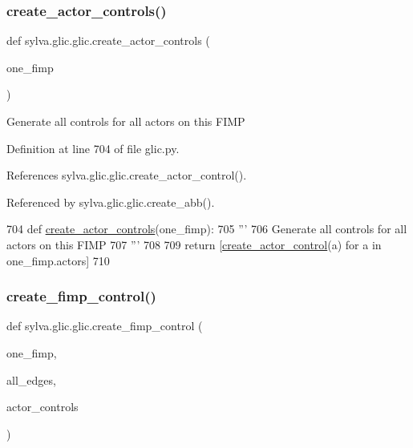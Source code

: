 \subsubsection{\texorpdfstring{create\+\_\+actor\+\_\+controls()}{create\_actor\_controls()}}
{\footnotesize\ttfamily def sylva.\+glic.\+glic.\+create\+\_\+actor\+\_\+controls (\begin{DoxyParamCaption}\item[{}]{one\+\_\+fimp }\end{DoxyParamCaption})}

\begin{DoxyVerb}  Generate all controls for all actors on this FIMP
\end{DoxyVerb}
 

Definition at line 704 of file glic.\+py.



References sylva.\+glic.\+glic.\+create\+\_\+actor\+\_\+control().



Referenced by sylva.\+glic.\+glic.\+create\+\_\+abb().


\begin{DoxyCode}
704     \textcolor{keyword}{def }\hyperlink{namespacesylva_1_1glic_1_1glic_a0b179ee41ee4494cf7450be4ca272db4}{create\_actor\_controls}(one\_fimp):
705         \textcolor{stringliteral}{'''}
706 \textcolor{stringliteral}{          Generate all controls for all actors on this FIMP}
707 \textcolor{stringliteral}{        '''}
708 
709         \textcolor{keywordflow}{return} [\hyperlink{namespacesylva_1_1glic_1_1glic_ae31a233cafcb3a83bd369c491b133b91}{create\_actor\_control}(a) \textcolor{keywordflow}{for} a \textcolor{keywordflow}{in} one\_fimp.actors]
710 
\end{DoxyCode}
\mbox{\label{namespacesylva_1_1glic_1_1glic_a1cdd3394b53489429bc51c8206e1180e}} 
\subsubsection{\texorpdfstring{create\+\_\+fimp\+\_\+control()}{create\_fimp\_control()}}
{\footnotesize\ttfamily def sylva.\+glic.\+glic.\+create\+\_\+fimp\+\_\+control (\begin{DoxyParamCaption}\item[{}]{one\+\_\+fimp,  }\item[{}]{all\+\_\+edges,  }\item[{}]{actor\+\_\+controls }\end{DoxyParamCaption})}


